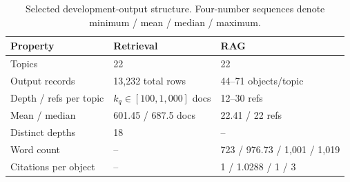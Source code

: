 \begin{table}[H]
\centering
\caption{Selected development-output structure. Four-number sequences
denote minimum / mean / median / maximum.}
\label{tab:output-stats}
\small
\setlength{\tabcolsep}{3pt}
\renewcommand{\arraystretch}{1.08}
\begin{tabularx}{\columnwidth}{@{}>{\raggedright\arraybackslash}p{}YY@{}}
\toprule
Property & Retrieval & RAG \\
\midrule
Topics & 22 & 22 \\
Output records & 13,232 total rows & 44--71 objects/topic \\
Depth / refs per topic & $k_q\in[100,1{,}000]$ docs & 12--30 refs \\
Mean / median & 601.45 / 687.5 docs & 22.41 / 22 refs \\
Distinct depths & 18 & -- \\
Word count & -- & 723 / 976.73 / 1,001 / 1,019 \\
Citations per object & -- & 1 / 1.0288 / 1 / 3 \\
\bottomrule
\end{tabularx}
\end{table}
